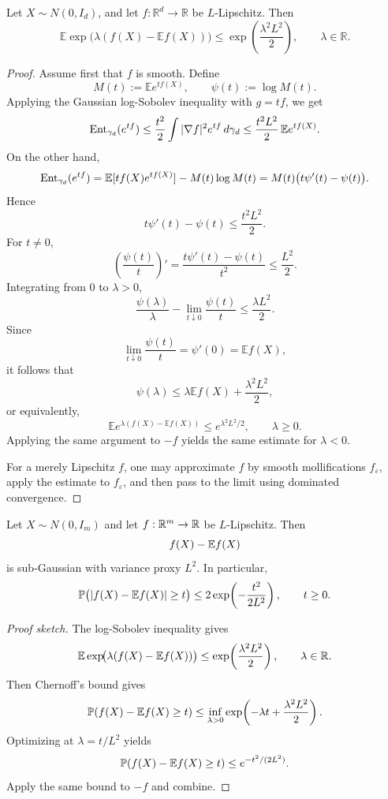 \begin{cor}
Let $X\sim N(0,I_d)$, and let $f:\mathbb{R}^d\to\mathbb{R}$ be $L$-Lipschitz. Then
\[
\mathbb{E}\exp\!\bigl(\lambda(f(X)-\mathbb{E}f(X))\bigr)
\le
\exp\!\left(\frac{\lambda^2L^2}{2}\right),
\qquad \lambda\in\mathbb{R}.
\]
\end{cor}

\begin{proof}
Assume first that $f$ is smooth. Define
\[
M(t):=\mathbb{E}e^{tf(X)},
\qquad
\psi(t):=\log M(t).
\]
Applying the Gaussian log-Sobolev inequality with $g=tf$, we get
\[
\operatorname{Ent}_{\gamma_d}(e^{tf})
\le
\frac{t^2}{2}\int |\nabla f|^2e^{tf}\,d\gamma_d
\le
\frac{t^2L^2}{2}\,\mathbb{E}e^{tf(X)}.
\]
On the other hand,
\[
\operatorname{Ent}_{\gamma_d}(e^{tf})
=
\mathbb{E}[tf(X)e^{tf(X)}]-M(t)\log M(t)
=
M(t)\bigl(t\psi'(t)-\psi(t)\bigr).
\]
Hence
\[
t\psi'(t)-\psi(t)\le \frac{t^2L^2}{2}.
\]
For $t\neq 0$,
\[
\left(\frac{\psi(t)}{t}\right)'
=
\frac{t\psi'(t)-\psi(t)}{t^2}
\le
\frac{L^2}{2}.
\]
Integrating from $0$ to $\lambda>0$,
\[
\frac{\psi(\lambda)}{\lambda}
-
\lim_{t\downarrow 0}\frac{\psi(t)}{t}
\le
\frac{\lambda L^2}{2}.
\]
Since
\[
\lim_{t\downarrow 0}\frac{\psi(t)}{t}
=
\psi'(0)
=
\mathbb{E}f(X),
\]
it follows that
\[
\psi(\lambda)\le \lambda \mathbb{E}f(X)+\frac{\lambda^2L^2}{2},
\]
or equivalently,
\[
\mathbb{E}e^{\lambda(f(X)-\mathbb{E}f(X))}
\le
e^{\lambda^2L^2/2},
\qquad \lambda\ge 0.
\]
Applying the same argument to $-f$ yields the same estimate for $\lambda<0$.

For a merely Lipschitz $f$, one may approximate $f$ by smooth mollifications $f_\varepsilon$,
apply the estimate to $f_\varepsilon$, and then pass to the limit using dominated convergence.
\end{proof}


\begin{thm}
Let $X\sim N(0,I_m)$ and let $f:\mathbb{R}^m\to \mathbb{R}$ be $L$-Lipschitz. Then
\[
f(X)-\mathbb{E} f(X)
\]
is sub-Gaussian with variance proxy $L^2$. In particular,
\[
\mathbb{P}\bigl(|f(X)-\mathbb{E} f(X)|\ge t\bigr)
\le
2\exp\!\left(-\frac{t^2}{2L^2}\right),
\qquad t\ge 0.
\]
\end{thm}

\begin{proof}[Proof sketch]
The log-Sobolev inequality gives
\[
\mathbb{E} \exp\!\bigl(\lambda(f(X)-\mathbb{E} f(X))\bigr)
\le
\exp\!\left(\frac{\lambda^2L^2}{2}\right),
\qquad \lambda\in\mathbb{R}.
\]
Then Chernoff's bound gives
\[
\mathbb{P}(f(X)-\mathbb{E} f(X)\ge t)
\le
\inf_{\lambda>0}
\exp\!\left(-\lambda t+\frac{\lambda^2L^2}{2}\right).
\]
Optimizing at $\lambda=t/L^2$ yields
\[
\mathbb{P}(f(X)-\mathbb{E} f(X)\ge t)\le e^{-t^2/(2L^2)}.
\]
Apply the same bound to $-f$ and combine.
\end{proof}

